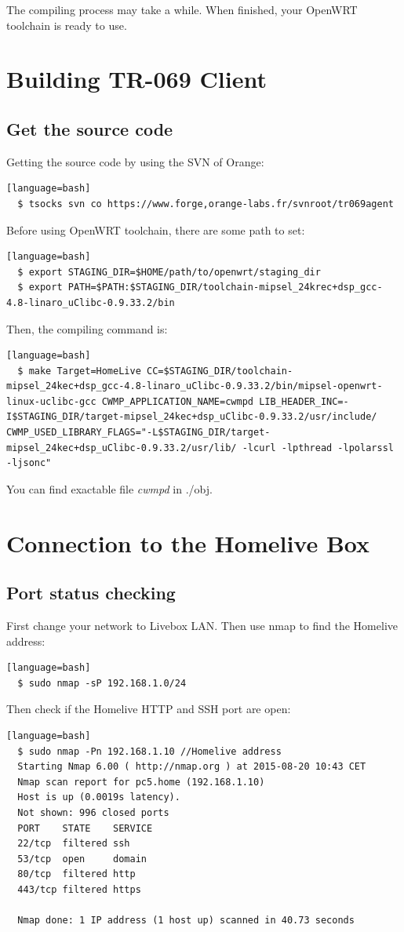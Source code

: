 The compiling process may take a while. When finished, your OpenWRT toolchain is ready to use.

\section{Building TR-069 Client}
\subsection{Get the source code}
Getting the source code by using the SVN of Orange:
\begin{lstlisting}[style=DOS][language=bash]
  $ tsocks svn co https://www.forge,orange-labs.fr/svnroot/tr069agent
\end{lstlisting}


Before using OpenWRT toolchain, there are some path to set:
\begin{lstlisting}[style=DOS][language=bash]
  $ export STAGING_DIR=$HOME/path/to/openwrt/staging_dir
  $ export PATH=$PATH:$STAGING_DIR/toolchain-mipsel_24krec+dsp_gcc-4.8-linaro_uClibc-0.9.33.2/bin
\end{lstlisting}

Then, the compiling command is:
\begin{lstlisting}[style=DOS][language=bash]
  $ make Target=HomeLive CC=$STAGING_DIR/toolchain-mipsel_24kec+dsp_gcc-4.8-linaro_uClibc-0.9.33.2/bin/mipsel-openwrt-linux-uclibc-gcc CWMP_APPLICATION_NAME=cwmpd LIB_HEADER_INC=-I$STAGING_DIR/target-mipsel_24kec+dsp_uClibc-0.9.33.2/usr/include/ CWMP_USED_LIBRARY_FLAGS="-L$STAGING_DIR/target-mipsel_24kec+dsp_uClibc-0.9.33.2/usr/lib/ -lcurl -lpthread -lpolarssl -ljsonc"
\end{lstlisting}

You can find exactable file \textit{cwmpd} in ./obj.
\section{Connection to the Homelive Box}
\subsection{Port status checking}
First change your network to Livebox LAN. Then use nmap to find the Homelive address:
\begin{lstlisting}[style=DOS][language=bash]
  $ sudo nmap -sP 192.168.1.0/24
\end{lstlisting}
Then check if the Homelive HTTP and SSH port are open:
\begin{lstlisting}[style=DOS][language=bash]
  $ sudo nmap -Pn 192.168.1.10 //Homelive address
  Starting Nmap 6.00 ( http://nmap.org ) at 2015-08-20 10:43 CET
  Nmap scan report for pc5.home (192.168.1.10)
  Host is up (0.0019s latency).
  Not shown: 996 closed ports
  PORT    STATE    SERVICE
  22/tcp  filtered ssh
  53/tcp  open     domain
  80/tcp  filtered http
  443/tcp filtered https

  Nmap done: 1 IP address (1 host up) scanned in 40.73 seconds
\end{lstlisting}

